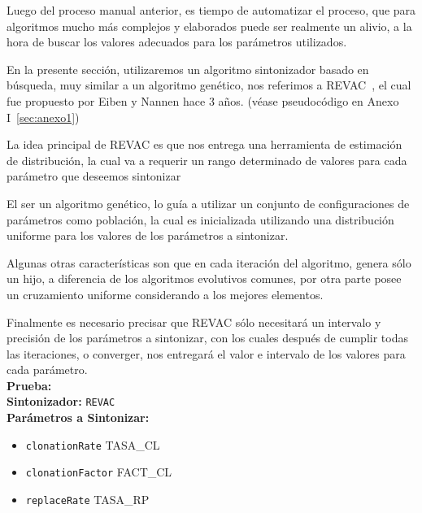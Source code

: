Luego del proceso manual anterior, es tiempo de automatizar el proceso,
que para algoritmos mucho más complejos y elaborados puede ser realmente un alivio,
a la hora de buscar los valores adecuados para los parámetros utilizados.

En la presente sección, utilizaremos un algoritmo sintonizador basado en búsqueda,
muy similar a un algoritmo genético, nos referimos a REVAC~\cite{REVAC},
el cual fue propuesto por Eiben y Nannen hace 3 años. (véase pseudocódigo en Anexo I~\ref{sec:anexo1})

La idea principal de REVAC es que nos entrega una herramienta de estimación
de distribución, la cual va a requerir un rango determinado de valores para
cada parámetro que deseemos sintonizar

El ser un algoritmo genético, lo guía a utilizar un
conjunto de configuraciones de parámetros como población, la cual es inicializada
utilizando una distribución uniforme para los valores de los parámetros a sintonizar.

Algunas otras características son que en cada iteración del algoritmo, genera sólo
un hijo, a diferencia de los algoritmos evolutivos comunes, por otra parte posee
un cruzamiento uniforme considerando a los mejores elementos.

Finalmente es necesario precisar que REVAC sólo necesitará un intervalo y precisión
de los parámetros a sintonizar, con los cuales después de cumplir todas las iteraciones,
o converger, nos entregará el valor e intervalo de los valores para cada parámetro.\\ 

\textbf{Prueba:} \\

\textbf{Sintonizador:} \texttt{REVAC}\\

\textbf{Parámetros a Sintonizar:}\\

\begin{itemize}
	\item \texttt{clonationRate} TASA\_CL \blue{[0,1]}
	\item \texttt{clonationFactor} FACT\_CL \blue{[0,1]}
	\item \texttt{replaceRate} TASA\_RP \blue{[0,1]}
\end{itemize}

